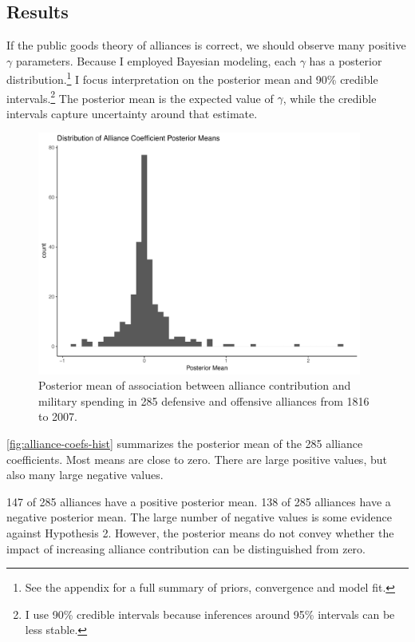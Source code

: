 \documentclass[12pt]{article}
\begin{document}
\subsection{Results} 


If the public goods theory of alliances is correct, we should observe many positive $\gamma$ parameters. 
Because I employed Bayesian modeling, each $\gamma$ has a posterior distribution.\footnote{See the appendix for a full summary of priors, convergence and model fit.} 
I focus interpretation on the posterior mean and 90\% credible intervals.\footnote{I use 90\% credible intervals because inferences around 95\% intervals can be less stable.}
The posterior mean is the expected value of $\gamma$, while the credible intervals capture uncertainty around that estimate.  


\begin{figure}[htbp]
	\centering
		\includegraphics[width=0.95\textwidth]{alliance-coefs-hist.pdf}
	\caption{Posterior mean of association between alliance contribution and military spending in 285 defensive and offensive alliances from 1816 to 2007.}
	\label{fig:alliance-coefs-hist}
\end{figure}


\autoref{fig:alliance-coefs-hist} summarizes the posterior mean of the 285 alliance coefficients. 
Most means are close to zero. 
There are large positive values, but also many large negative values.


147 of 285 alliances have a positive posterior mean. 
138 of 285 alliances have a negative posterior mean. 
The large number of negative values is some evidence against Hypothesis 2. 
However, the posterior means do not convey whether the impact of increasing alliance contribution can be distinguished from zero. 
\end{document}
